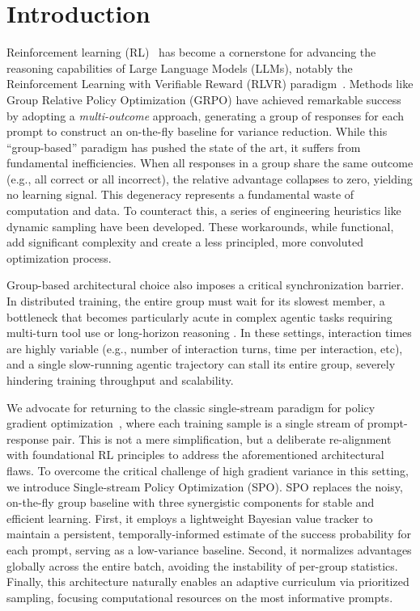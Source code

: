 \section{Introduction}

Reinforcement learning (RL)~\cite{rlbook} has become a cornerstone for advancing the reasoning capabilities of Large Language Models (LLMs), notably the Reinforcement Learning with Verifiable Reward (RLVR) paradigm~\cite{RLVR,R1}. Methods like Group Relative Policy Optimization (GRPO) \cite{GRPO, R1} have achieved remarkable success by adopting a \emph{multi-outcome} approach, generating a group of responses for each prompt to construct an on-the-fly baseline for variance reduction. While this ``group-based'' paradigm has pushed the state of the art, it suffers from fundamental inefficiencies. When all responses in a group share the same outcome (e.g., all correct or all incorrect), the relative advantage collapses to zero, yielding no learning signal. This degeneracy represents a fundamental waste of computation and data. To counteract this, a series of engineering heuristics like dynamic sampling \cite{DAPO} have been developed. These workarounds, while functional, add significant complexity and create a less principled, more convoluted optimization process.

Group-based architectural choice also imposes a critical synchronization barrier. In distributed training, the entire group must wait for its slowest member, a bottleneck that becomes particularly acute in complex agentic tasks requiring multi-turn tool use or long-horizon reasoning \cite{gao2025beyond, xu2025agents,zeng2025glm}. In these settings, interaction times are highly variable (e.g., number of interaction turns, time per interaction, etc), and a single slow-running agentic trajectory can stall its entire group, severely hindering training throughput and scalability.

We advocate for returning to the classic single-stream paradigm for policy gradient optimization~\cite{rlbook}, where each training sample is a single stream of prompt-response pair. This is not a mere simplification, but a deliberate re-alignment with foundational RL principles to address the aforementioned architectural flaws. To overcome the critical challenge of high gradient variance in this setting, we introduce Single-stream Policy Optimization (SPO). SPO replaces the noisy, on-the-fly group baseline with three synergistic components for stable and efficient learning. First, it employs a lightweight Bayesian value tracker to maintain a persistent, temporally-informed estimate of the success probability for each prompt, serving as a low-variance baseline. Second, it normalizes advantages globally across the entire batch, avoiding the instability of per-group statistics. Finally, this architecture naturally enables an adaptive curriculum via prioritized sampling, focusing computational resources on the most informative prompts.


